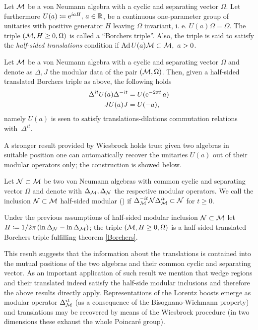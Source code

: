  \begin{definition}
 Let $\mathcal{M}$ be a von Neumann algebra with a cyclic and separating
 vector $\Omega$. Let furthermore $U(a)\coloneqq \operatorname{e}^{iaH},\,a\in\mathbb{R}$, 
 be a continuous one-parameter group of unitaries with positive
 generator $H$ leaving $\Omega$ invariant, i. e. $U(a)\Omega=
 \Omega$. The triple $(\mathcal{M}, H\geq 0, \Omega)$ is called a 
 ``Borchers triple''. Also, the triple is said to satisfy the 
 \emph{half-sided translations} condition if
 $\operatorname{Ad}{U(a)}\mathcal{M}\subset\mathcal{M},\ a>0$. 
 \end{definition}
 \begin{theorem}
 \label{Borchers}
 Let $\mathcal{M}$ be a von Neumann algebra with a cyclic and separating
 vector $\Omega$ and denote as $\Delta, J$ the modular data of the pair
 $(\mathcal{M},\Omega)$. Then, given a half-sided translated Borchers 
 triple as above, the following  holds
 \begin{align}
 \Delta^{it}U(a)\Delta^{-it}&=U(\operatorname{e}^{-2\pi t}a)\label{Bor}\\
 JU(a)J&=U(-a), 
 \end{align}
 namely $U(a)$ is seen to satisfy translations-dilations commutation relations
 with~$\Delta^{it}$.
 \end{theorem}
 A stronger result provided by Wiesbrock holds true: given two algebras
 in suitable position one can automatically recover the unitaries
 $U(a)$ out of their modular operators only; the construction is showed
 below.
 \begin{definition}
 Let $\mathcal{N}\subset\mathcal{M}$ be two von Neumann algebras with common
 cyclic and separating vector $\Omega$ and denote with $\Delta_{\mathcal{M}},
 \Delta_{\mathcal{N}}$ the respective modular operators. We call the 
 inclusion $\mathcal{N}\subset\mathcal{M}$ half-sided modular (\cite*{Wies1})
 if $\Delta_{\mathcal{M}}^{-it}\mathcal{N}\Delta_{\mathcal{M}}^{it}\subset\mathcal{N}$
 for $t\geq 0$.
 \end{definition}
 \begin{theorem}
 \label{Wies:th}
 Under the previous assumptions of half-sided modular inclusion
 $\mathcal{N}\subset\mathcal{M}$ let $H\coloneqq 1/2\pi 
 \left(\ln \Delta_{\mathcal{N}}-\ln \Delta_{\mathcal{M}}\right)$; 
 the triple $(\mathcal{M}, H\geq 0, \Omega)$ is a half-sided translated
 Borchers triple fulfilling theorem \ref{Borchers}. 
 \end{theorem}
 This result suggests that the information about the translations
 is contained into the mutual positions of the two algebras and their
 common cyclic and separating vector. As an important application
 of such result we mention that wedge regions and their translated
 indeed satisfy the half-side modular inclusions and therefore
 the above results directly apply. Representations of the 
 Lorentz boosts emerge as modular operator $\Delta^{it}_{\mathcal{M}}$ (as a 
 consequence of the Bisognano-Wichmann property) and  
 translations may be recovered by means of the Wiesbrock procedure
 (in two dimensions these exhaust the whole Poincar\'{e} group).
 

 

 
 

 
 
